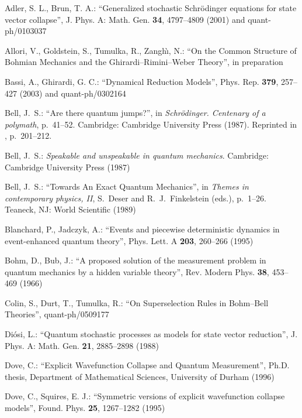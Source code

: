 \documentclass[12pt]{article}
\newcommand{\1}{1}
\begin{document}
\begin{thebibliography}{[20]}

 Adler, S. L., Brun, T. A.:
    ``Generalized stochastic Schr\"odinger equations for state vector collapse'',
    J. Phys. A: Math. Gen. \textbf{34}, 4797--4809 (2001)
    and quant-ph/0103037

 Allori, V., Goldstein, S., Tumulka, R., Zangh\`\i, N.:
   ``On the Common Structure of Bohmian Mechanics and the
   Ghirardi--Rimini--Weber Theory'', in preparation

 Bassi, A., Ghirardi, G. C.: ``Dynamical
  Reduction Models'', Phys. Rep. \textbf{379}, 257--427 (2003) and
  quant-ph/0302164

 Bell, J.~S.: ``Are there quantum jumps?'', in
  \textit{Schr\"odinger. Centenary of a polymath}, p.~41--52.
  Cambridge: Cambridge University Press (1987). Reprinted in
  \cite{Bellbook}, p.~201--212.

 Bell, J.~S.: \textit{Speakable and unspeakable in
  quantum mechanics}.  Cambridge: Cambridge University Press (1987)

 Bell, J.~S.: ``Towards An Exact Quantum
  Mechanics'', in \textit{Themes in contemporary physics, II},
  S.~Deser and R.~J.~Finkelstein (eds.), p.~1--26.
  Teaneck, NJ: World Scientific (1989)

 Blanchard, P., Jadczyk, A.: ``Events and piecewise
   deterministic dynamics in event-enhanced quantum theory'',
   Phys. Lett. A \textbf{203}, 260--266 (1995)

  Bohm, D., Bub, J.: ``A proposed solution of the 
  measurement problem in quantum mechanics by a hidden 
  variable theory'',  Rev. Modern Phys. \textbf{38}, 453--469 (1966)

 Colin, S., Durt, T., Tumulka, R.: ``On Superselection
   Rules in Bohm--Bell Theories'', quant-ph/0509177

 Di\'osi, L.: ``Quantum stochastic processes as
  models for state vector reduction'', J. Phys.  A: Math. Gen. \textbf{21},
  2885--2898 (1988)

 Dove, C.: ``Explicit Wavefunction Collapse and
  Quantum Measurement'', Ph.D. thesis, Department of Mathematical
  Sciences, University of Durham (1996)

 Dove, C., Squires, E. J.: ``Symmetric versions of 
   explicit wavefunction collapse models'',  
   Found. Phys.  \textbf{25}, 1267--1282 (1995)
 

\end{thebibliography}
\end{document}
